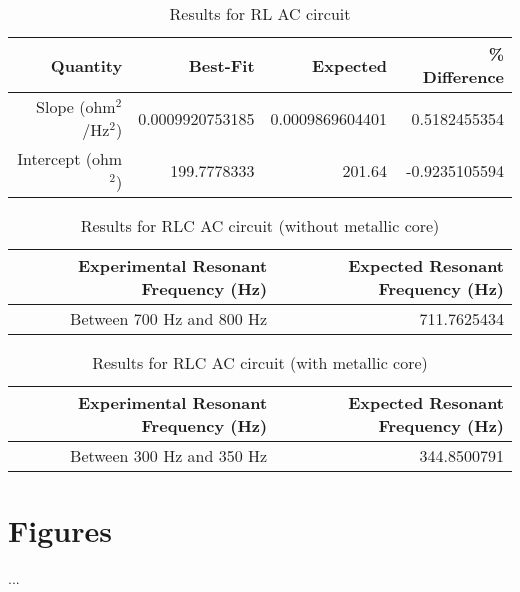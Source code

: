 \begin{table}[ht]
	\begin{center}
		\begin{tabular}{|r|r|r|r|}
			\hline
			Quantity & Best-Fit & Expected & \% Difference \\
			\hline
			Slope (ohm$^{2}$/Hz$^{2}$) & 0.0009920753185 & 0.0009869604401 & 0.5182455354 \\
			Intercept (ohm$^{2}$) & 199.7778333 & 201.64 & -0.9235105594 \\
			\hline
		\end{tabular}
	\end{center}
	\caption{Results for RL AC circuit}
	\label{table.results.RL}
\end{table}
\begin{table}[ht]
	\begin{center}
		\begin{tabular}{|r|r|}
			\hline
			Experimental Resonant Frequency (Hz) & Expected Resonant Frequency (Hz) \\
			\hline
			Between 700 Hz and 800 Hz & 711.7625434 \\
			\hline
		\end{tabular}
	\end{center}
	\caption{Results for RLC AC circuit (without metallic core)}
	\label{table.results.RLC}
\end{table}
\begin{table}[ht]
	\begin{center}
		\begin{tabular}{|r|r|}
			\hline
			Experimental Resonant Frequency (Hz) & Expected Resonant Frequency (Hz) \\
			\hline
			Between 300 Hz and 350 Hz & 344.8500791 \\
			\hline
		\end{tabular}
	\end{center}
	\caption{Results for RLC AC circuit (with metallic core)}
	\label{table.results.RLCcore}
\end{table}
\pagebreak
\section{Figures}
...